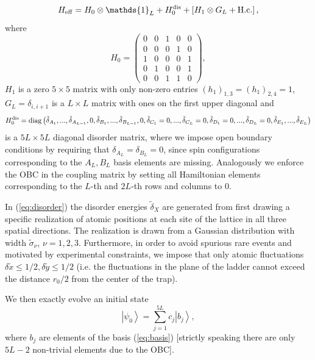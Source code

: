\documentclass[prl,aps,twocolumn,showpacs,superscriptaddress,longbibliography]{revtex4-1}
\newcommand{\ran}{\right\rangle}
\newcommand{\ket}[1]{\left| #1 \ran}
\begin{document}
\begin{equation}
	H_{\rm eff} = H_0 \otimes \mathds{1}_L + H_0^{\rm dis} + \left[ H_1 \otimes G_L + {\rm H.c.} \right],
	\label{eq:H eff}
\end{equation}
where
\begin{equation}
	H_0 =
 \begin{pmatrix}
  	 0 & 0 & 1 & 0 & 0 \\
     0 & 0 & 0 & 1 & 0 \\
     1 & 0 & 0 & 0 & 1 \\
     0 & 1 & 0 & 0 & 1 \\
     0 & 0 & 1 & 1 & 0
 \end{pmatrix},
\end{equation}
$H_1$ is a zero $5 \times 5$ matrix with only non-zero entries $(h_1)_{1,3}=(h_1)_{2,4}=1$, $G_L = \delta_{i,i+1}$ is a $L \times L$ matrix with ones on the first upper diagonal and 
\begin{equation}
	H_0^{\rm dis} = {\rm diag} \left( \tilde{\delta}_{A_1},...,\tilde{\delta}_{A_{L-1}},0,\tilde{\delta}_{B_1},...,\tilde{\delta}_{B_{L-1}},0,\tilde{\delta}_{C_1}=0,...,\tilde{\delta}_{C_{L}}=0,\tilde{\delta}_{D_1}=0,...,\tilde{\delta}_{D_{L}}=0,\tilde{\delta}_{E_1},...,\tilde{\delta}_{E_{L}}\right)
	\label{eq:disorder}
\end{equation}
is a $5L \times 5L$ diagonal disorder matrix, where we impose open boundary conditions by requiring that $\delta_{A_L} = \delta_{B_L}=0$, since spin configurations corresponding to the $A_L,B_L$ basis elements are missing. Analogously we enforce the OBC in the coupling matrix by setting all Hamiltonian elements corresponding to the $L$-th and $2L$-th rows and columns to 0. 

In (\ref{eq:disorder}) the disorder energies $\tilde{\delta}_X$ are generated from first drawing a specific realization of atomic positions at each site of the lattice in all three spatial directions. The realization is drawn from a Gaussian distribution with width $\tilde{\sigma}_\nu$, $\nu=1,2,3$. Furthermore, in order to avoid spurious rare events and motivated by experimental constraints, we impose that only atomic fluctuations $\delta \tilde{x} \leq 1/2, \delta \tilde{y} \leq 1/2$ (i.e. the fluctuations in the plane of the ladder cannot exceed the distance $r_0/2$ from the center of the trap).

We then exactly evolve an initial state
\begin{equation}
	\ket{\psi_0} = \sum_{j=1}^{5L} c_j \ket{b_j},
\end{equation}
where $b_j$ are elements of the basis (\ref{eq:basis}) [strictly speaking there are only $5L-2$ non-trivial elements due to the OBC]. 
\end{document}
